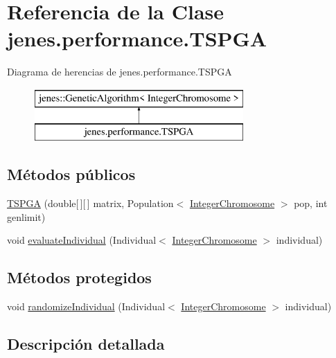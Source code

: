 \hypertarget{classjenes_1_1performance_1_1_t_s_p_g_a}{\section{Referencia de la Clase jenes.\-performance.\-T\-S\-P\-G\-A}
\label{classjenes_1_1performance_1_1_t_s_p_g_a}
}
Diagrama de herencias de jenes.\-performance.\-T\-S\-P\-G\-A\begin{figure}[H]
\begin{center}
\leavevmode
\includegraphics[height=2.000000cm]{classjenes_1_1performance_1_1_t_s_p_g_a}
\end{center}
\end{figure}
\subsection*{Métodos públicos}
\begin{DoxyCompactItemize}
\item 
\hyperlink{classjenes_1_1performance_1_1_t_s_p_g_a_a698ea31a106a7f42ffc65997bbee05fe}{T\-S\-P\-G\-A} (double\mbox{[}$\,$\mbox{]}\mbox{[}$\,$\mbox{]} matrix, Population$<$ \hyperlink{classjenes_1_1chromosome_1_1_integer_chromosome}{Integer\-Chromosome} $>$ pop, int genlimit)
\item 
void \hyperlink{classjenes_1_1performance_1_1_t_s_p_g_a_a78282f6c98a63d8f438364a79d8239ab}{evaluate\-Individual} (Individual$<$ \hyperlink{classjenes_1_1chromosome_1_1_integer_chromosome}{Integer\-Chromosome} $>$ individual)
\end{DoxyCompactItemize}
\subsection*{Métodos protegidos}
\begin{DoxyCompactItemize}
\item 
void \hyperlink{classjenes_1_1performance_1_1_t_s_p_g_a_a469f2cfa3bf84b07af85546e610fd624}{randomize\-Individual} (Individual$<$ \hyperlink{classjenes_1_1chromosome_1_1_integer_chromosome}{Integer\-Chromosome} $>$ individual)
\end{DoxyCompactItemize}


\subsection{Descripción detallada}


